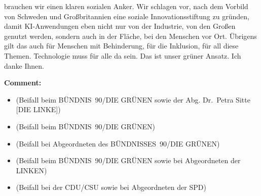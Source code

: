 \documentclass{article}
\begin{document}
brauchen wir einen klaren sozialen Anker. Wir schlagen vor, nach dem Vorbild von Schweden und Großbritannien eine soziale Innovationsstiftung zu gründen, damit KI-Anwendungen eben nicht nur von der Industrie, von den Großen genutzt werden, sondern auch in der Fläche, bei den Menschen vor Ort. Übrigens gilt das auch für Menschen mit Behinderung, für die Inklusion, für all diese Themen. Technologie muss für alle da sein. Das ist unser grüner Ansatz. Ich danke Ihnen.  

\noindent\textbf{Comment:}
\begin{itemize}
    \setlength\itemsep{-3pt}
    \item (Beifall beim BÜNDNIS 90/DIE GRÜNEN sowie der Abg. Dr. Petra Sitte [DIE LINKE])
    \setlength\itemsep{-3pt}
    \item (Beifall beim BÜNDNIS 90/DIE GRÜNEN)
    \setlength\itemsep{-3pt}
    \item (Beifall bei Abgeordneten des BÜNDNISSES 90/DIE GRÜNEN)
    \setlength\itemsep{-3pt}
    \item (Beifall beim BÜNDNIS 90/DIE GRÜNEN sowie bei Abgeordneten der LINKEN)
    \setlength\itemsep{-3pt}
    \item (Beifall bei der CDU/CSU sowie bei Abgeordneten der SPD)
\end{itemize}
\end{document}
